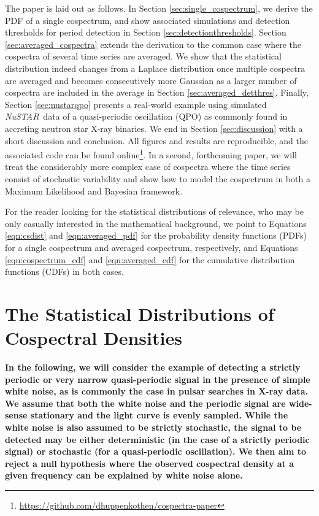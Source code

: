 \documentclass[12pt]{emulateapj}
\newcommand{\project}[1]{\textsl{#1}}
\newcommand{\nustar}{\project{NuSTAR}\xspace}
\begin{document}
The paper is laid out as follows. In Section \ref{sec:single_cospectrum}, we derive the PDF of a single cospectrum, and show associated simulations and detection thresholds for period detection in Section \ref{sec:detectionthresholds}. Section \ref{sec:averaged_cospectra} extends the derivation to the common case where the cospectra of several time series are averaged. We show that the statistical distribution indeed changes from a Laplace distribution once multiple cospectra are averaged and becomes consecutively more Gaussian as a larger number of cospectra are included in the average in Section \ref{sec:averaged_detthres}. Finally, Section \ref{sec:nustarqpo} presents a real-world example using simulated \nustar\ data of a quasi-periodic oscillation (QPO) as commonly found in accreting neutron star X-ray binaries. We end in Section \ref{sec:discussion} with a short discussion and conclusion. All figures and results are reproducible, and the associated code can be found online\footnote{\url{https://github.com/dhuppenkothen/cospectra-paper}}.
In a second, forthcoming paper, we will treat the considerably more complex case of cospectra where the time series consist of stochastic variability and show how to model the cospectrum in both a Maximum Likelihood and Bayesian framework.

For the reader looking for the statistical distributions of relevance, who may be only casually interested in the mathematical background, we point to Equations \ref{eqn:csdist} and \ref{eqn:averaged_pdf} for the probability density functions (PDFs) for a single cospectrum and averaged cospectrum, respectively, and Equations \ref{eqn:cospectrum_cdf} and \ref{eqn:averaged_cdf} for the cumulative distribution functions (CDFs) in both cases.


\section{The Statistical Distributions of Cospectral Densities}
\label{sec:whitenoise_cospectra}

\textbf{In the following, we will consider the example of detecting a strictly periodic or very narrow quasi-periodic signal in the presence of simple white noise, as is commonly the case in pulsar searches in X-ray data. We assume that both the white noise and the periodic signal are wide-sense stationary and the light curve is evenly sampled. While the white noise is also assumed to be strictly stochastic, the signal to be detected may be either deterministic (in the case of a strictly periodic signal) or stochastic (for a quasi-periodic oscillation). We then aim to reject a null hypothesis where the observed cospectral density at a given frequency can be explained by white noise alone.}
\end{document}
